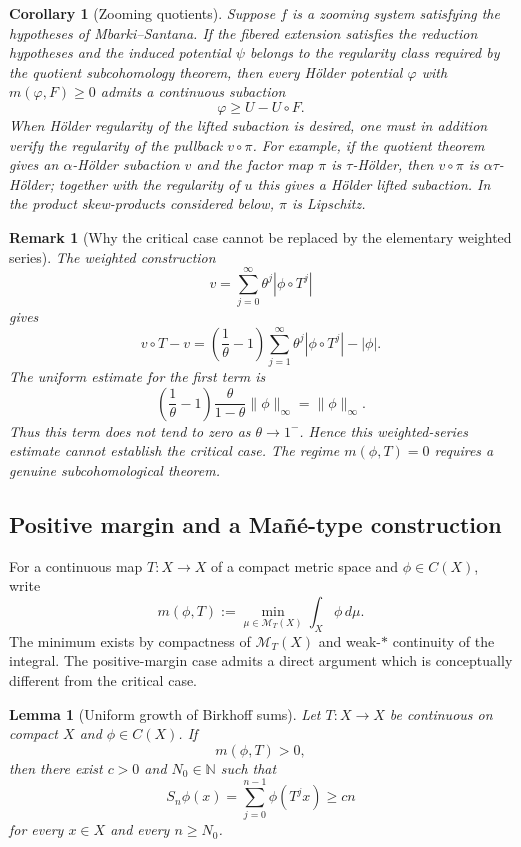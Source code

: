 \documentclass[11pt,a4paper]{article}
\newtheorem{lemma}[theorem]{Lemma}
\newtheorem{corollary}[theorem]{Corollary}
\newtheorem{remark}[theorem]{Remark}
\begin{document}
\begin{corollary}[Zooming quotients]
\label{cor:zooming}
Suppose $f$ is a zooming system satisfying the hypotheses of
Mbarki--Santana. If the fibered extension satisfies the reduction
hypotheses and the induced potential $\psi$ belongs to the regularity class
required by the quotient subcohomology theorem, then every H\"older potential
$\varphi$ with $m(\varphi,F)\geq0$ admits a continuous subaction
\[
\varphi\geq U-U\circ F.
\]
When H\"older regularity of the lifted subaction is desired, one must in
addition verify the regularity of the pullback $v\circ\pi$. For example, if
the quotient theorem gives an $\alpha$-H\"older subaction $v$ and the
factor map $\pi$ is $\tau$-H\"older, then $v\circ\pi$ is
$\alpha\tau$-H\"older; together with the regularity of $u$ this gives a
H\"older lifted subaction. In the product skew-products considered below,
$\pi$ is Lipschitz.
\end{corollary}

\begin{remark}[Why the critical case cannot be replaced by the elementary
weighted series]
The weighted construction
\[
v=\sum_{j=0}^{\infty}\theta^j|\phi\circ T^j|
\]
gives
\[
v\circ T-v
=
\left(\frac1\theta-1\right)
\sum_{j=1}^{\infty}\theta^j|\phi\circ T^j|
-|\phi|.
\]
The uniform estimate for the first term is
\[
\left(\frac1\theta-1\right)
\frac{\theta}{1-\theta}\|\phi\|_\infty
=
\|\phi\|_\infty.
\]
Thus this term does \emph{not} tend to zero as $\theta\to1^-$. Hence
this weighted-series estimate cannot establish the critical case. The
regime $m(\phi,T)=0$ requires a genuine subcohomological theorem.
\end{remark}

\subsection{Positive margin and a Mañ\'e-type construction}

For a continuous map $T:X\to X$ of a compact metric space and
$\phi\in C(X)$, write
\[
 m(\phi,T)
 :=\min_{\mu\in\mathcal M_T(X)}\int_X\phi\,d\mu.
\]
The minimum exists by compactness of $\mathcal M_T(X)$ and weak-$*$
continuity of the integral. The positive-margin case admits a direct argument
which is conceptually different from the critical case.

\begin{lemma}[Uniform growth of Birkhoff sums]
\label{lem:uniform-growth}
Let $T:X\to X$ be continuous on compact $X$ and $\phi\in C(X)$. If
\[
m(\phi,T)>0,
\]
then there exist $c>0$ and $N_0\in\mathbb N$ such that
\[
S_n\phi(x)
=
\sum_{j=0}^{n-1}\phi(T^jx)
\geq cn
\]
for every $x\in X$ and every $n\geq N_0$.
\end{lemma}
\end{document}
